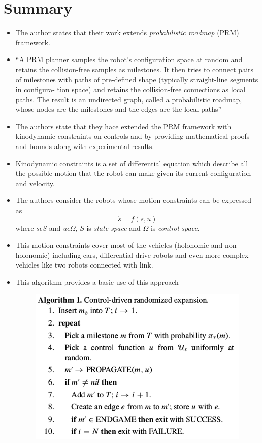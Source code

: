 \documentclass[12pt]{article}
\begin{document}
\section{Summary}
\begin{itemize}
    \item The author states that their work extends \textit{probabilistic roadmap} (PRM) framework\cite{kavraki1996}.
    \item ``A PRM planner samples the robot’s configuration space at
        random and retains the collision-free samples as milestones.
        It then tries to connect pairs of milestones with paths of pre-defined shape (typically straight-line segments in configura-
        tion space) and retains the collision-free connections as local
        paths. The result is an undirected graph, called a probabilistic roadmap, whose nodes are the milestones and the edges
        are the local paths''\cite{hsu2002randomized}
    \item The authors state that they hace extended the PRM framework with kinodynamic constraints on controls and by providing mathematical proofs and bounds along with experimental results.
    \item Kinodynamic constraints is a set of differential equation which describe all the possible motion that the robot can make given its current configuration and velocity.
    \item The authors consider the robots whose motion constraints can be expressed as $$\dot s = f(s, u)$$ where $s \epsilon S$ and $u \epsilon \Omega$, $S$ is \textit{state space} and $\Omega$ is \textit{control space}.
    \item This motion constraints cover most of the vehicles (holonomic and non holonomic) including cars, differential drive robots and even more complex vehicles like two robots connected with link.
    \item This algorithm provides a basic use of this approach
        \begin{figure}[ht!]
            \centering
            \includegraphics[width=0.6\linewidth]{algo.png}

\end{figure}
\end{itemize}
\end{document}
